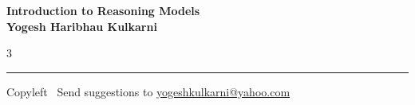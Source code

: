 \documentclass[8pt,landscape]{article}
\begin{document}
\footnotesize


\begin{center}
\Large{\textbf{Introduction to Reasoning Models\\ Yogesh Haribhau Kulkarni}}
\end{center}

\begin{multicols}{3}

\end{multicols}

\rule{\linewidth}{0.25pt}
\scriptsize
Copyleft \textcopyleft\  Send suggestions to
\href{http://www.yogeshkulkarni.com}{yogeshkulkarni@yahoo.com}
\end{document}
